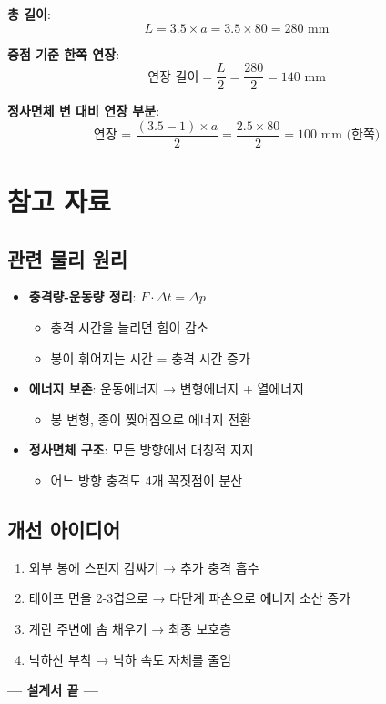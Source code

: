 \documentclass[a4paper,12pt]{article}
\begin{document}
\begin{CJK}{UTF8}{mj}
\textbf{총 길이}:
\[
L = 3.5 \times a = 3.5 \times 80 = 280 \text{ mm}
\]

\textbf{중점 기준 한쪽 연장}:
\[
\text{연장 길이} = \frac{L}{2} = \frac{280}{2} = 140 \text{ mm}
\]

\textbf{정사면체 변 대비 연장 부분}:
\[
\text{연장 = } \frac{(3.5 - 1) \times a}{2} = \frac{2.5 \times 80}{2} = 100 \text{ mm (한쪽)}
\]

\section{참고 자료}

\subsection{관련 물리 원리}

\begin{itemize}
    \item \textbf{충격량-운동량 정리}: $F \cdot \Delta t = \Delta p$
    \begin{itemize}
        \item 충격 시간을 늘리면 힘이 감소
        \item 봉이 휘어지는 시간 = 충격 시간 증가
    \end{itemize}
    
    \item \textbf{에너지 보존}: 운동에너지 → 변형에너지 + 열에너지
    \begin{itemize}
        \item 봉 변형, 종이 찢어짐으로 에너지 전환
    \end{itemize}
    
    \item \textbf{정사면체 구조}: 모든 방향에서 대칭적 지지
    \begin{itemize}
        \item 어느 방향 충격도 4개 꼭짓점이 분산
    \end{itemize}
\end{itemize}

\subsection{개선 아이디어}

\begin{enumerate}
    \item 외부 봉에 스펀지 감싸기 → 추가 충격 흡수
    \item 테이프 면을 2-3겹으로 → 다단계 파손으로 에너지 소산 증가
    \item 계란 주변에 솜 채우기 → 최종 보호층
    \item 낙하산 부착 → 낙하 속도 자체를 줄임
\end{enumerate}

\vspace{1cm}

\begin{center}
\large
\textbf{--- 설계서 끝 ---}
\end{center}

\end{CJK}
\end{document}

